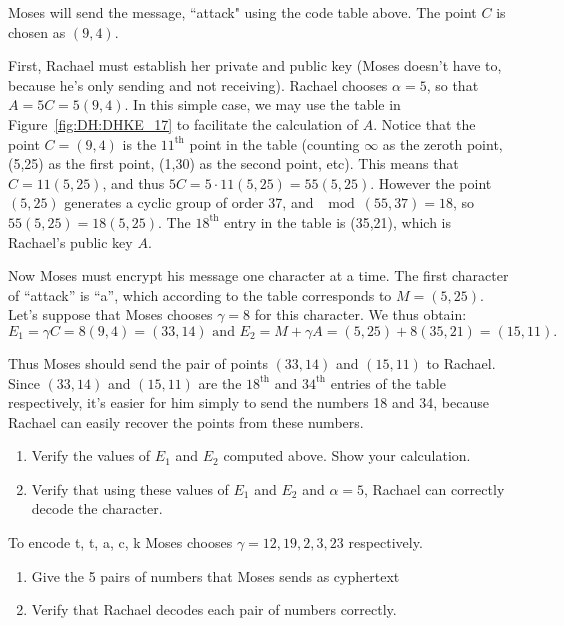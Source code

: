 \begin{example}\label{example:further_crypt:26} Moses will send the message, ``attack" using the code table above. The point $C$ is chosen as $(9,4)$. 

First, Rachael must establish her private and public key (Moses doesn't have to, because he's only sending and not receiving). Rachael chooses $\alpha= 5$, so that $A = 5C = 5(9,4)$. In this simple case, we  may use  the table in Figure~\ref{fig:DH:DHKE_17} to facilitate the calculation of $A$.  Notice that the point $C=(9,4)$ is the $11^{\textrm{th}}$ point in the table (counting $\infty$ as the zeroth point, (5,25) as the first point, (1,30) as the second point, etc). This means that $C = 11(5,25)$, and thus $5C = 5\cdot11(5,25) = 55(5,25)$.  However the point $(5,25)$ generates a cyclic group of order 37, and $\mod(55,37)=18$, so $55(5,25)=18(5,25)$.  The $18^{\textrm{th}}$ entry in the table is (35,21), which is Rachael's public key $A$.

Now Moses must encrypt his message one character at a time. The first character of ``attack'' is ``a'', which according to the table corresponds to $M=(5,25)$.  Let's suppose that Moses chooses $\gamma = 8$ for this character. We thus obtain:
\[
E_1=\gamma C = 8(9,4)=(33,14)  \text{   and   } 
E_2 = M +  \gamma A=(5,25) + 8(35,21) = (15,11). 
\]

Thus Moses should send the pair of points $(33,14)$ and $(15,11)$ to Rachael. Since $(33,14)$ and $(15,11)$ are the $18^{\textrm{th}}$ and $34^{\textrm{th}}$ entries of the table respectively, it's easier for him simply to send the numbers 18 and 34, because Rachael can easily recover the points from these numbers.

\begin{exercise}\label{exercise:further_crypt:}
\begin{enumerate}[a]
\item
Verify the values of $E_1$ and $E_2$ computed above. Show your calculation.
\item
Verify that using these values of $E_1$ and $E_2$ and $\alpha=5$, Rachael can correctly decode the character.
\end{enumerate}
\end{exercise}

\begin{exercise}\label{exercise:further_crypt:}
To encode t, t, a, c, k Moses chooses $\gamma = 12,19,2,3,23$ respectively. 
\begin{enumerate}[a]
\item Give the 5 pairs of numbers that Moses sends as cyphertext
\item Verify that Rachael decodes each pair of numbers correctly.
\end{enumerate}
\end{exercise}

\end{example}

